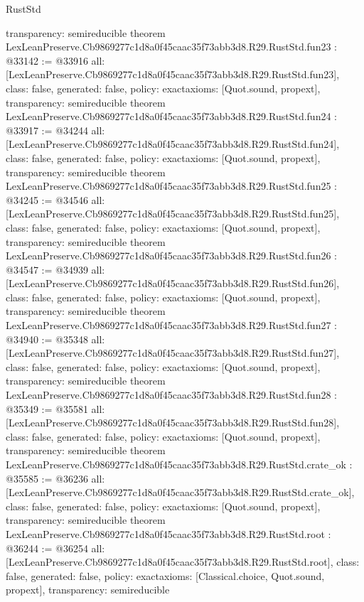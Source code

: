 \begin{lexlean}{RustStd}
\begin{coremodule}
{  transparency: semireducible
}
theorem LexLeanPreserve.Cb9869277c1d8a0f45caac35f73abb3d8.R29.RustStd.fun23 : @33142 := @33916 {
  all: [LexLeanPreserve.Cb9869277c1d8a0f45caac35f73abb3d8.R29.RustStd.fun23],
  class: false,
  generated: false,
  policy: exact{axioms: [Quot.sound, propext]},
  transparency: semireducible
}
theorem LexLeanPreserve.Cb9869277c1d8a0f45caac35f73abb3d8.R29.RustStd.fun24 : @33917 := @34244 {
  all: [LexLeanPreserve.Cb9869277c1d8a0f45caac35f73abb3d8.R29.RustStd.fun24],
  class: false,
  generated: false,
  policy: exact{axioms: [Quot.sound, propext]},
  transparency: semireducible
}
theorem LexLeanPreserve.Cb9869277c1d8a0f45caac35f73abb3d8.R29.RustStd.fun25 : @34245 := @34546 {
  all: [LexLeanPreserve.Cb9869277c1d8a0f45caac35f73abb3d8.R29.RustStd.fun25],
  class: false,
  generated: false,
  policy: exact{axioms: [Quot.sound, propext]},
  transparency: semireducible
}
theorem LexLeanPreserve.Cb9869277c1d8a0f45caac35f73abb3d8.R29.RustStd.fun26 : @34547 := @34939 {
  all: [LexLeanPreserve.Cb9869277c1d8a0f45caac35f73abb3d8.R29.RustStd.fun26],
  class: false,
  generated: false,
  policy: exact{axioms: [Quot.sound, propext]},
  transparency: semireducible
}
theorem LexLeanPreserve.Cb9869277c1d8a0f45caac35f73abb3d8.R29.RustStd.fun27 : @34940 := @35348 {
  all: [LexLeanPreserve.Cb9869277c1d8a0f45caac35f73abb3d8.R29.RustStd.fun27],
  class: false,
  generated: false,
  policy: exact{axioms: [Quot.sound, propext]},
  transparency: semireducible
}
theorem LexLeanPreserve.Cb9869277c1d8a0f45caac35f73abb3d8.R29.RustStd.fun28 : @35349 := @35581 {
  all: [LexLeanPreserve.Cb9869277c1d8a0f45caac35f73abb3d8.R29.RustStd.fun28],
  class: false,
  generated: false,
  policy: exact{axioms: [Quot.sound, propext]},
  transparency: semireducible
}
theorem LexLeanPreserve.Cb9869277c1d8a0f45caac35f73abb3d8.R29.RustStd.crate_ok : @35585 := @36236 {
  all: [LexLeanPreserve.Cb9869277c1d8a0f45caac35f73abb3d8.R29.RustStd.crate_ok],
  class: false,
  generated: false,
  policy: exact{axioms: [Quot.sound, propext]},
  transparency: semireducible
}
theorem LexLeanPreserve.Cb9869277c1d8a0f45caac35f73abb3d8.R29.RustStd.root : @36244 := @36254 {
  all: [LexLeanPreserve.Cb9869277c1d8a0f45caac35f73abb3d8.R29.RustStd.root],
  class: false,
  generated: false,
  policy: exact{axioms: [Classical.choice, Quot.sound, propext]},
  transparency: semireducible
}


\end{coremodule}
\end{lexlean}
